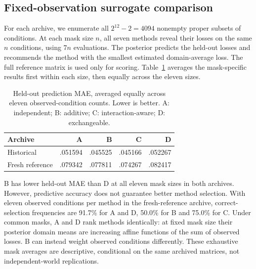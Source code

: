 \subsection{Fixed-observation surrogate comparison}
For each archive, we enumerate all $2^{12}-2=4094$ nonempty proper subsets of conditions. At each mask size $n$, all seven methods reveal their losses on the same $n$ conditions, using $7n$ evaluations. The posterior predicts the held-out losses and recommends the method with the smallest estimated domain-average loss. The full reference matrix is used only for scoring. Table~\ref{tab:rq2-fixed-consolidated} averages the mask-specific results first within each size, then equally across the eleven sizes.
\begin{table}[htbp]
\centering\small
\caption{Held-out prediction MAE, averaged equally across eleven observed-condition counts. Lower is better. A: independent; B: additive; C: interaction-aware; D: exchangeable.}
\label{tab:rq2-fixed-consolidated}
\begin{tabular}{lrrrr}
\toprule
Archive & A & B & C & D\\
\midrule
Historical & .051594 & .045525 & .045166 & .052267\\
Fresh reference & .079342 & .077811 & .074267 & .082417\\
\bottomrule
\end{tabular}
\end{table}
B has lower held-out MAE than D at all eleven mask sizes in both archives. However, predictive accuracy does not guarantee better method selection. With eleven observed conditions per method in the fresh-reference archive, correct-selection frequencies are 91.7\% for A and D, 50.0\% for B and 75.0\% for C. Under common masks, A and D rank methods identically: at fixed mask size their posterior domain means are increasing affine functions of the sum of observed losses. B can instead weight observed conditions differently. These exhaustive mask averages are descriptive, conditional on the same archived matrices, not independent-world replications.

